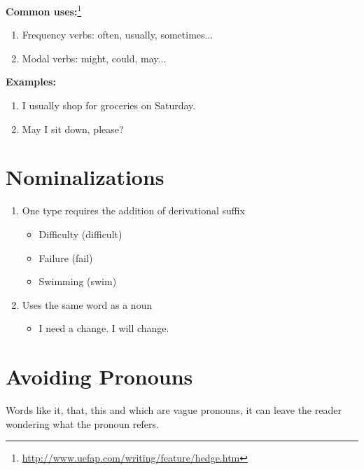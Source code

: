 \documentclass[10pt,a4paper]{book}
\begin{document}
\textbf{Common uses:}\footnote{\url{http://www.uefap.com/writing/feature/hedge.htm}}
\begin{enumerate}
\item  Frequency verbs: often, usually, sometimes...
\item  Modal verbs: might, could, may...
\end{enumerate}
\textbf{Examples:}
\begin{enumerate}
\item I usually shop for groceries on Saturday.
\item May I sit down, please?
\end{enumerate}


\section{Nominalizations}
\begin{enumerate}
\item One type requires the addition of derivational suffix
\begin{itemize}
\item Difficulty (difficult)
\item  Failure (fail)
\item Swimming (swim)
\end{itemize}
\item Uses the same word as a noun
\begin{itemize}
\item I need a change. I will change.
\end{itemize}
\end{enumerate}


\section{Avoiding Pronouns}\label{Avoiding Pronouns}

Words like it, that, this and which are vague pronouns, it can leave the reader wondering what the pronoun refers.

\end{document}
